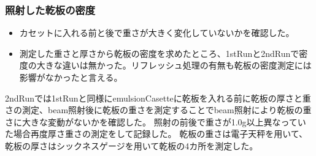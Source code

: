 \documentclass[12pt,a4paper]{jarticle}
\begin{document}
\subsubsection{照射した乾板の密度}
\begin{itemize}
 \item カセットに入れる前と後で重さが大きく変化していないかを確認した。
 \item 測定した重さと厚さから乾板の密度を求めたところ、1stRunと2ndRunで密度の大きな違いは無かった。リフレッシュ処理の有無も乾板の密度測定には影響がなかったと言える。
\end{itemize}
2ndRunでは1stRunと同様にemulsionCasetteに乾板を入れる前に乾板の厚さと重さの測定、beam照射後に乾板の重さを測定することでbeam照射により乾板の重さに大きな変動がないかを確認した。
照射の前後で重さが1.0g以上異なっていた場合再度厚さ重さの測定をして記録した。
乾板の重さは電子天秤を用いて、乾板の厚さはシックネスゲージを用いて乾板の4カ所を測定した。
\par
\end{document}
